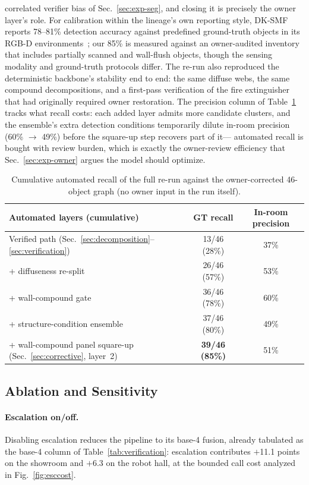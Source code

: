 correlated verifier bias of Sec.~\ref{sec:exp-seg}, and closing it is
precisely the owner layer's role. For calibration within the lineage's
own reporting style, DK-SMF reports 78--81\% detection accuracy against
predefined ground-truth objects in its RGB-D environments~\cite{joo2025dksmf};
our 85\% is measured against an owner-audited inventory that includes
partially scanned and wall-flush objects, though the sensing modality
and ground-truth protocols differ. The re-run also reproduced the
deterministic backbone's stability end to end: the same diffuse webs,
the same compound decompositions, and a first-pass verification of the
fire extinguisher that had originally required owner restoration. The
precision column of Table~\ref{tab:layers} tracks what recall costs:
each added layer admits more candidate clusters, and the ensemble's
extra detection conditions temporarily dilute in-room precision (60\%
$\rightarrow$ 49\%) before the square-up step recovers part of it---
automated recall is bought with review burden, which is exactly the
owner-review efficiency that Sec.~\ref{sec:exp-owner} argues the model
should optimize.

\begin{table}[t]
\centering
\caption{Cumulative automated recall of the full re-run against the
owner-corrected 46-object graph (no owner input in the run itself).}
\label{tab:layers}
\small
\begin{tabular}{@{}lcc@{}}
\toprule
Automated layers (cumulative) & GT recall & In-room precision \\
\midrule
Verified path (Sec.~\ref{sec:decomposition}--\ref{sec:verification}) &
13/46 (28\%) & 37\% \\
+ diffuseness re-split & 26/46 (57\%) & 53\% \\
+ wall-compound gate & 36/46 (78\%) & 60\% \\
+ structure-condition ensemble & 37/46 (80\%) & 49\% \\
+ wall-compound panel square-up (Sec.~\ref{sec:corrective}, layer~2) & \textbf{39/46 (85\%)} & 51\% \\
\bottomrule
\end{tabular}
\end{table}

\subsection{Ablation and Sensitivity}
\label{sec:exp-ablation}

\paragraph{Escalation on/off.}
Disabling escalation reduces the pipeline to its base-4 fusion, already
tabulated as the base-4 column of Table~\ref{tab:verification}: escalation
contributes $+$11.1 points on the showroom and $+$6.3 on the robot hall,
at the bounded call cost analyzed in Fig.~\ref{fig:esccost}.

